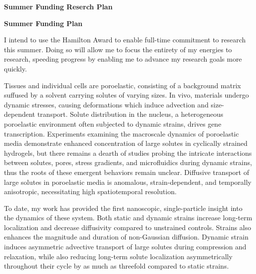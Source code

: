 
\clearpage

 
\recipient{}{} %
\date{\today} %
\opening{\textbf{Summer Funding Reserch Plan}} %
\closing{} %


\textbf{Summer Funding Plan}\par
I intend to use the Hamilton Award to enable full-time commitment to research this summer. Doing so will allow me to focus the entirety of my energies to research, speeding progress by enabling me to advance my research goals more quickly. \par 

Tissues and individual cells are poroelastic, consisting of a background matrix suffused by a solvent carrying solutes of varying sizes. In vivo, materials undergo dynamic stresses, causing deformations which induce advection and size-dependent transport. Solute distribution in the nucleus, a heterogeneous poroelastic environment often subjected to dynamic strains, drives gene transcription. Experiments examining the macroscale dynamics of poroelastic media demonstrate enhanced concentration of large solutes in cyclically strained hydrogels, but there remains a dearth of studies probing the intricate interactions between solutes, pores, stress gradients, and microfluidics during dynamic strains, thus the roots of these emergent behaviors remain unclear. Diffusive transport of large solutes in poroelastic media is anomalous, strain-dependent, and temporally anisotropic, necessitating high spatiotemporal resolution. \par

To date, my work has provided the first nanoscopic, single-particle insight into the dynamics of these system. Both static and dynamic strains increase long-term localization and decrease diffusivity compared to unstrained controls. Strains also enhances the magnitude and duration of non-Gaussian diffusion. Dynamic strain induces asymmetric advective transport of large solutes during compression and relaxation, while also reducing long-term solute localization asymmetrically throughout their cycle by as much as threefold compared to static strains. \par

